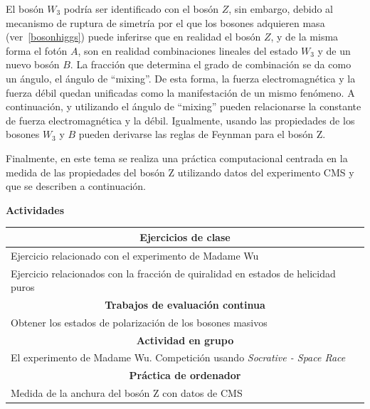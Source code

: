 El bosón $W_3$ podría ser identificado con el bosón $Z$, sin embargo, debido al mecanismo de ruptura de simetría por el que los bosones adquieren masa (ver~\ref{bosonhiggs}) puede inferirse que en realidad el bosón $Z$, y de la misma forma el fotón $A$, son en realidad combinaciones lineales del estado $W_3$ y de un nuevo bosón $B$. La fracción que determina el grado de combinación se da como un ángulo, el ángulo de ``mixing''. De esta forma, la fuerza electromagnética y la fuerza débil quedan unificadas como la manifestación de un mismo fenómeno. A continuación, y utilizando el ángulo de ``mixing'' pueden relacionarse la constante de fuerza electromagnética y la débil. Igualmente, usando las propiedades de los bosones $W_3$ y $B$ pueden derivarse las reglas de Feynman para el bosón Z. 

Finalmente, en este tema se realiza una práctica computacional centrada en la medida de las propiedades del bosón Z utilizando datos del experimento CMS y que se describen a continuación. 

\textbf{Actividades}



\begin{center}
\begin{tabularx}{\textwidth}{|X|}
\hline\hline
\multicolumn{1}{|c|}{\textbf{Ejercicios de clase}}\\
\hline\hline
Ejercicio relacionado con el experimento de Madame Wu \\
\hline
Ejercicio relacionados con la fracción de quiralidad en estados de helicidad puros \\
\hline\hline
\multicolumn{1}{|c|}{\textbf{Trabajos de evaluación continua}}\\
\hline\hline
Obtener los estados de polarización de los bosones masivos \\
\hline\hline
\multicolumn{1}{|c|}{\textbf{Actividad en grupo}}\\
\hline\hline
El experimento de Madame Wu. Competición usando \emph{Socrative - Space Race}\\
\hline\hline
\multicolumn{1}{|c|}{\textbf{Práctica de ordenador}}\\
\hline\hline
Medida de la anchura del bosón Z con datos de CMS\\
\hline\hline
\end{tabularx}
\end{center}

